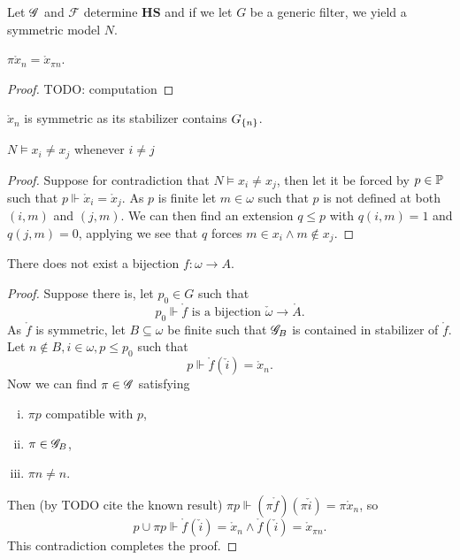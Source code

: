 Let \(\G\) and \(\mathscr{F}\) determine \(\mathbf{HS}\) and if we let \(G\) be a generic filter, we yield a symmetric model \(N\).

\begin{lemma}
    \(\pi \mathring{x}_n = \mathring{x}_{\pi n} \).
\end{lemma}
\begin{proof}
    TODO: computation
\end{proof}
\begin{corollary}
    \(\mathring{x}_n\) is symmetric as its stabilizer contains \(G_\set{n}\).
\end{corollary}

\begin{lemma}
    \(N\models x_i\ne x_j\) whenever \(i\ne j\)
\end{lemma}
\begin{proof}
    Suppose for contradiction that \(N\models x_i\ne x_j\),
    then let it be forced by \(p\in \P\) such that \(p\Vdash \mathring{x}_i = \mathring{x}_j\).
    As \(p\) is finite let \(m\in\omega\) such that \(p\) is not defined at both \((i,m)\) and \((j,m)\).
    We can then find an extension \(q\leq p\) with \(q(i,m) = 1\) and \(q(j,m) = 0\),
    applying 
    we see that \(q\) forces \(m\in x_i \land m\notin x_j\).
\end{proof}

\begin{lemma}
    There does not exist a bijection \(f:\omega\to A\).
\end{lemma}
\begin{proof}
Suppose there is, let \(p_0 \in G\) such that \[p_0\Vdash \mathring{f} \text{ is a bijection } \check{\omega}\to\mathring{A}. \]
As \(\mathring{f}\) is symmetric, let \(B\subseteq \omega\) be finite such that \(\G_B\) is contained in stabilizer of \(\mathring{f}\).
Let \(n\notin B, i\in\omega, p\leq p_0\) such that \[p\Vdash \mathring{f}(\check{i}) = \mathring{x}_n.\]
Now we can find \(\pi\in\G\) satisfying
\begin{enumerate}[i.]
    \item \(\pi p\) compatible with \(p\),
    \item \(\pi \in \G_B\),
    \item \(\pi n\ne n\).
\end{enumerate}
Then (by TODO cite the known result) \(\pi p \Vdash (\pi \mathring{f})(\pi \check{i}) = \pi \mathring{x}_{n}\), so
\[p \cup \pi p \Vdash \mathring{f}(\check{i}) = \mathring{x}_n \land \mathring{f}(\check{i}) = \mathring{x}_{\pi n}. \]
This contradiction completes the proof.
\end{proof}

